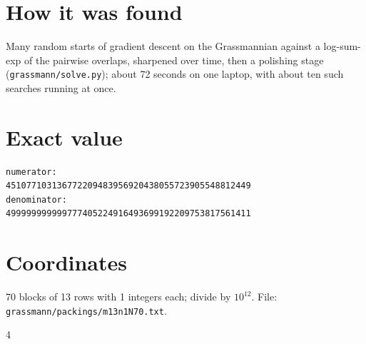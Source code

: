 \documentclass[11pt,a4paper]{article}
\begin{document}
\section{How it was found}
Many random starts of gradient descent on the Grassmannian against a log-sum-exp of the pairwise overlaps, sharpened over time, then a polishing stage (\texttt{grassmann/solve.py}); about 72 seconds on one laptop, with about ten such searches running at once.


\appendix
\section{Exact value}
{\small
\begin{verbatim}
numerator:
451077103136772209483956920438055723905548812449
denominator:
499999999999777405224916493699192209753817561411
\end{verbatim}}

\section{Coordinates}
70 blocks of 13 rows with 1 integers each; divide by $10^{12}$. File: \texttt{grassmann/packings/m13n1N70.txt}.
{\tiny
\begin{multicols}{4}
\end{multicols}}
\end{document}
